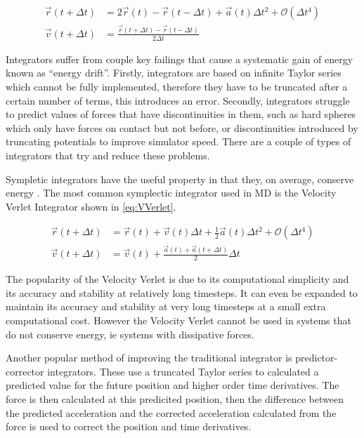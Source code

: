 \documentclass[12pt]{UoAthesis}
\begin{document}
\begin{subequations}
  \begin{align}
    \vec{r}(t + \Delta t) &= 2\vec{r}(t) - \vec{r}(t - \Delta t) + \vec{a}(t)\Delta t^2 + \mathcal{O}(\Delta t^4) \label{eq:Verletpos} \\
    \vec{v}(t+\Delta t) &= \frac{\vec{r}(t+\Delta t) - \vec{r}(t-\Delta t)}{2\Delta t} \label{eq:VerletVel}
  \end{align}
\end{subequations}

Integrators suffer from couple key failings that cause a systematic
gain of energy known as ``energy drift''. Firstly, integrators are
based on infinite Taylor series which cannot be fully implemented,
therefore they have to be truncated after a certain number of terms,
this introduces an error. Secondly, integrators struggle to predict
values of forces that have discontinuities in them, such as hard
spheres which only have forces on contact but not before, or
discontinuities introduced by truncating potentials to improve
simulator speed.  There are a couple of types of integrators that try
and reduce these problems.

Sympletic integrators have the useful property in that they, on
average, conserve energy \cite{Hairer2003}.  The most common
symplectic integrator used in MD is the Velocity Verlet Integrator
\cite{Swope1982} shown in \eqref{eq:VVerlet}.

\begin{subequations}
  \label{eq:VVerlet}
  \begin{align}
    \vec{r}(t + \Delta t) &= \vec{r}(t) + \vec{v}(t) \Delta t + \frac{1}{2}\vec{a}(t) \Delta t^2 + \mathcal{O}(\Delta t^4) \label{eq:VVerletpos} \\
    \vec{v}(t+\Delta t) &= \vec{v}(t) + \frac{\vec{a}(t)+\vec{a}(t+\Delta t)}{2}\Delta t \label{eq:VVerletVel} 
  \end{align}
\end{subequations}

The popularity of the Velocity Verlet is due to its computational
simplicity and its accuracy and stability at relatively long
timesteps.  It can even be expanded \cite{Khakimov2002} to maintain
its accuracy and stability at very long timesteps at a small extra
computational cost.  However the Velocity Verlet cannot be used in
systems that do not conserve energy, ie systems with dissipative
forces.

Another popular method of improving the traditional integrator is
predictor-corrector integrators.  These use a truncated Taylor series
to calculated a predicted value for the future position and higher
order time derivatives. The force is then calculated at this
predicited position, then the difference between the predicted
acceleration and the corrected acceleration calculated from the force
is used to correct the position and time derivatives.
\end{document}
